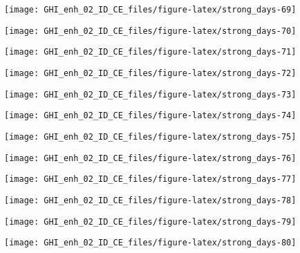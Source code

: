 \documentclass[
  10pt,
  a4paper,oneside]{article}
\begin{document}
\begin{center}\texttt{[image: GHI\_enh\_02\_ID\_CE\_files/figure-latex/strong\_days-69]} \end{center}

\begin{center}\texttt{[image: GHI\_enh\_02\_ID\_CE\_files/figure-latex/strong\_days-70]} \end{center}

\begin{center}\texttt{[image: GHI\_enh\_02\_ID\_CE\_files/figure-latex/strong\_days-71]} \end{center}

\begin{center}\texttt{[image: GHI\_enh\_02\_ID\_CE\_files/figure-latex/strong\_days-72]} \end{center}

\begin{center}\texttt{[image: GHI\_enh\_02\_ID\_CE\_files/figure-latex/strong\_days-73]} \end{center}

\begin{center}\texttt{[image: GHI\_enh\_02\_ID\_CE\_files/figure-latex/strong\_days-74]} \end{center}

\begin{center}\texttt{[image: GHI\_enh\_02\_ID\_CE\_files/figure-latex/strong\_days-75]} \end{center}

\begin{center}\texttt{[image: GHI\_enh\_02\_ID\_CE\_files/figure-latex/strong\_days-76]} \end{center}

\begin{center}\texttt{[image: GHI\_enh\_02\_ID\_CE\_files/figure-latex/strong\_days-77]} \end{center}

\begin{center}\texttt{[image: GHI\_enh\_02\_ID\_CE\_files/figure-latex/strong\_days-78]} \end{center}

\begin{center}\texttt{[image: GHI\_enh\_02\_ID\_CE\_files/figure-latex/strong\_days-79]} \end{center}

\begin{center}\texttt{[image: GHI\_enh\_02\_ID\_CE\_files/figure-latex/strong\_days-80]} \end{center}
\end{document}
